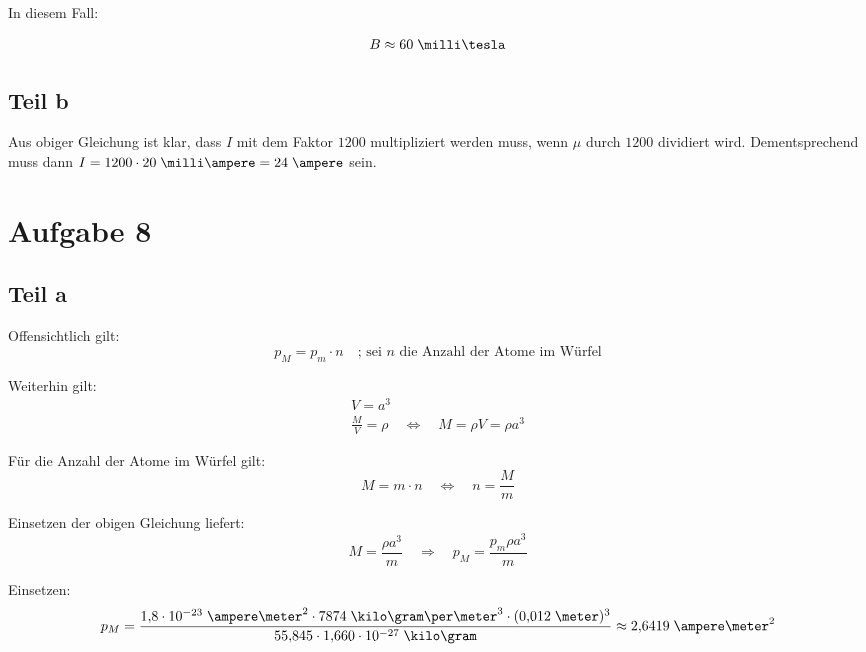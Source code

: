 \documentclass[a4paper,german,12pt,smallheadings]{scrartcl}
\begin{document}
In diesem Fall:

\begin{align*}
  B \approx 60 \;\milli\tesla
\end{align*}

\subsection*{Teil b}

Aus obiger Gleichung ist klar, dass $I$ mit dem Faktor $1200$ multipliziert
werden muss, wenn $\mu$ durch $1200$ dividiert wird. Dementsprechend muss dann
$I = 1200 \cdot 20\;\milli\ampere = 24\;\ampere$ sein.

\section*{Aufgabe 8}
\subsection*{Teil a}

Offensichtlich gilt:
\begin{equation*}
p_M=p_m \cdot n \quad \text{; sei $n$ die Anzahl der Atome im Würfel}
\end{equation*}

Weiterhin gilt:
\begin{align*}
V=a^3\\
\frac{M}{V}=\rho \quad \Leftrightarrow \quad M=\rho V = \rho a^3
\end{align*}

Für die Anzahl der Atome im Würfel gilt:
\begin{equation*}
M=m\cdot n \quad \Leftrightarrow \quad n=\frac{M}{m}
\end{equation*}

Einsetzen der obigen Gleichung liefert:
\begin{equation*}
M=\frac{\rho a^3}{m} \quad \Rightarrow \quad p_M=\frac{p_m \rho a^3}{m}
\end{equation*}

Einsetzen:
\begin{equation*}
p_M=\frac{1{,}8 \cdot 10^{-23}\;\ampere\meter^2 \cdot 7874 \;\kilo\gram\per\meter^3 \cdot (0{,}012 \;\meter)^3}{55{,}845 \cdot 1{,}660 \cdot 10^{-27} \;\kilo\gram} \approx 2{,}6419 \;\ampere\meter^2
\end{equation*}
\end{document}
